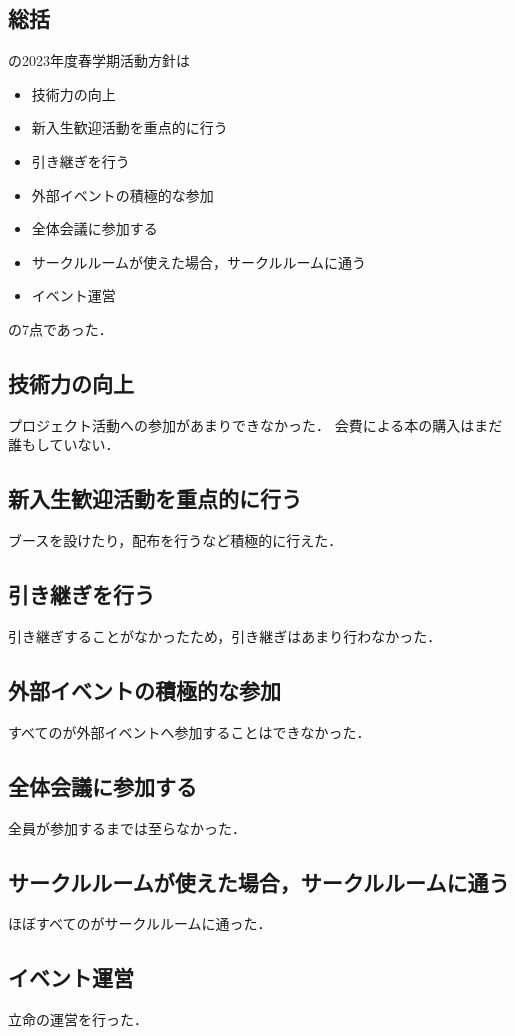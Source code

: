 \subsection*{\secondGrade{}総括}


\secondGrade{}の2023年度春学期活動方針は
\begin{itemize}
    \item 技術力の向上
    \item 新入生歓迎活動を重点的に行う
    \item 引き継ぎを行う
    \item 外部イベントの積極的な参加
    \item 全体会議に参加する
    \item サークルルームが使えた場合，サークルルームに通う
    \item イベント運営
\end{itemize}
の7点であった．

\subsection*{技術力の向上}
プロジェクト活動への参加があまりできなかった．
会費による本の購入はまだ誰もしていない．

\subsection*{新入生歓迎活動を重点的に行う}
ブースを設けたり，配布を行うなど積極的に行えた．

\subsection*{引き継ぎを行う}
引き継ぎすることがなかったため，引き継ぎはあまり行わなかった．

\subsection*{外部イベントの積極的な参加}
すべての\secondGrade{}が外部イベントへ参加することはできなかった．

\subsection*{全体会議に参加する}
全員が参加するまでは至らなかった．

\subsection*{サークルルームが使えた場合，サークルルームに通う}
ほぼすべての\secondGrade{}がサークルルームに通った．

\subsection*{イベント運営}
立命の運営を行った．
